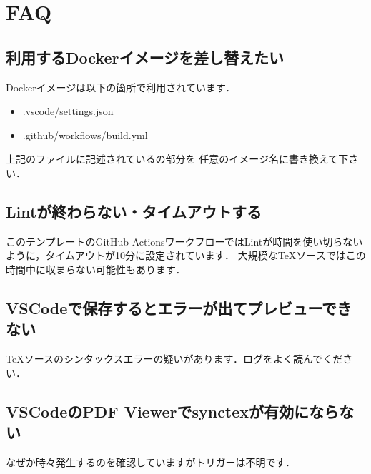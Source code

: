 \documentclass[main]{subfiles}
\begin{document}
\section{FAQ}

\subsection{利用するDockerイメージを差し替えたい}

Dockerイメージは以下の箇所で利用されています．

\begin{itemize}
    \item .vscode/settings.json
    \item .github/workflows/build.yml
\end{itemize}

上記のファイルに記述されているの部分を
任意のイメージ名に書き換えて下さい．

\subsection{Lintが終わらない・タイムアウトする}

このテンプレートのGitHub ActionsワークフローではLintが時間を使い切らないように，タイムアウトが10分に設定されています．
大規模なTeXソースではこの時間中に収まらない可能性もあります．

\subsection{VSCodeで保存するとエラーが出てプレビューできない}

TeXソースのシンタックスエラーの疑いがあります．ログをよく読んでください．

\subsection{VSCodeのPDF Viewerでsynctexが有効にならない}

なぜか時々発生するのを確認していますがトリガーは不明です．
\end{document}
